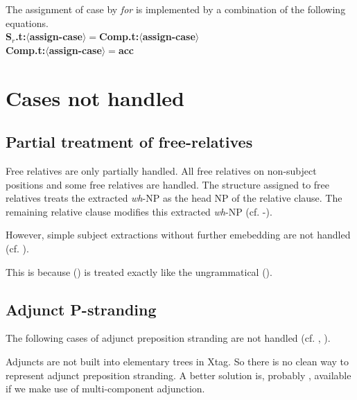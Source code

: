 The assignment of case by {\em for} is implemented by a combination of the
following equations.\\
{\bf S$_{r}$.t:$\langle$assign-case$\rangle =$Comp.t:$\langle$assign-case$\rangle$}\\
{\bf Comp.t:$\langle$assign-case$\rangle =$acc}

\section{Cases not handled}
\subsection{Partial treatment of free-relatives}
Free relatives are only partially handled. All free relatives on non-subject
positions and some free relatives are handled. The structure assigned 
to free relatives treats the extracted {\em wh}-NP as the head NP of
the relative clause. The remaining relative clause modifies this
extracted {\em wh}-NP (cf. -).


However, simple subject extractions without further emebedding are not
handled (cf. ).


This is because () is treated exactly like the ungrammatical
().



\subsection{Adjunct P-stranding}
The following cases of adjunct preposition stranding are not handled 
(cf. , ).


Adjuncts are not built into elementary trees in Xtag. So there is no
clean way to represent adjunct preposition stranding. A better
solution is, probably , available if we make use of multi-component
adjunction. 

